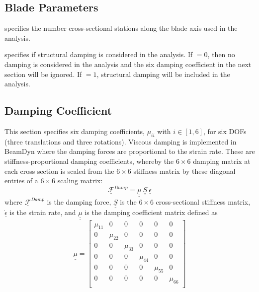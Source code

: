 \subsection{Blade Parameters}

 specifies the number cross-sectional stations along the blade axis used in the analysis.

 specifies if structural damping is considered in the analysis. 
If  $= 0 $, then no damping is considered in the analysis and the six damping coefficient in the next section will be ignored. 
If  $ = 1$, structural damping will be included in the analysis.

\subsection{Damping Coefficient}

This section specifies six damping coefficients, $\mu_{ii}$ with $i \in [1,6]$, for six DOFs (three translations and three rotations). 
Viscous damping is implemented in BeamDyn where the damping forces are proportional to the strain rate. 
These are stiffness-proportional damping coefficients, whereby the $6\times6$ damping matrix at each cross section is scaled from the $6 \times 6$ stiffness matrix by these diagonal entries of a $6 \times 6$ scaling matrix:
\begin{equation}
    \label{DampingForce}
    \mathcal{\underline{F}}^{Damp} = \underline{\underline{\mu}}~\underline{\underline{S}}~\dot{\underline{\epsilon}} 
\end{equation}
where $\mathcal{\underline{F}}^{Damp}$ is the damping force, $\underline{\underline{S}}$ is the $ 6 \times 6$ cross-sectional stiffness matrix, $\dot{\underline{\epsilon}} $ is the strain rate, and $\underline{\underline{\mu}}$ is the damping coefficient matrix defined as
\begin{equation}
   \label{DampMatrix}
   \underline{\underline{\mu}} = 
   \begin{bmatrix}
       \mu_{11} & 0 & 0 & 0 & 0 & 0 \\
       0 & \mu_{22} & 0 & 0 & 0 & 0 \\
       0 & 0 & \mu_{33} & 0 & 0 & 0 \\
       0 & 0 & 0 & \mu_{44} & 0 & 0 \\
       0 & 0 & 0 & 0 & \mu_{55} & 0 \\
       0 & 0 & 0 & 0 & 0 & \mu_{66} \\
   \end{bmatrix}
\end{equation}

